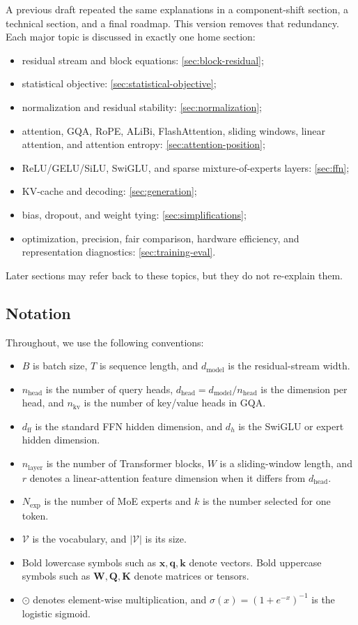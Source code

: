\documentclass[11pt,a4paper]{article}
\theoremstyle{definition}
\theoremstyle{plain}
\newcommand{\vx}{\bm{x}}
\newcommand{\vq}{\bm{q}}
\newcommand{\vk}{\bm{k}}
\newcommand{\mW}{\bm{W}}
\newcommand{\mQ}{\bm{Q}}
\newcommand{\mK}{\bm{K}}
\newcommand{\dmodel}{d_{\mathrm{model}}}
\newcommand{\dhead}{d_{\mathrm{head}}}
\newcommand{\dff}{d_{\mathrm{ff}}}
\newcommand{\nhead}{n_{\mathrm{head}}}
\newcommand{\nlayer}{n_{\mathrm{layer}}}
\newcommand{\vocab}{|\mathcal{V}|}
\begin{document}
\begin{motivationbox}
A previous draft repeated the same explanations in a component-shift section, a technical section, and a final roadmap. This version removes that redundancy. Each major topic is discussed in exactly one home section:
\begin{itemize}[nosep]
    \item residual stream and block equations: \cref{sec:block-residual};
    \item statistical objective: \cref{sec:statistical-objective};
    \item normalization and residual stability: \cref{sec:normalization};
    \item attention, GQA, RoPE, ALiBi, FlashAttention, sliding windows, linear attention, and attention entropy: \cref{sec:attention-position};
    \item ReLU/GELU/SiLU, SwiGLU, and sparse mixture-of-experts layers: \cref{sec:ffn};
    \item KV-cache and decoding: \cref{sec:generation};
    \item bias, dropout, and weight tying: \cref{sec:simplifications};
    \item optimization, precision, fair comparison, hardware efficiency, and representation diagnostics: \cref{sec:training-eval}.
\end{itemize}
Later sections may refer back to these topics, but they do not re-explain them.
\end{motivationbox}

\subsection{Notation}

Throughout, we use the following conventions:
\begin{itemize}[nosep]
    \item $B$ is batch size, $T$ is sequence length, and $\dmodel$ is the residual-stream width.
    \item $\nhead$ is the number of query heads, $\dhead=\dmodel/\nhead$ is the dimension per head, and $n_{\mathrm{kv}}$ is the number of key/value heads in GQA.
    \item $\dff$ is the standard FFN hidden dimension, and $d_h$ is the SwiGLU or expert hidden dimension.
    \item $\nlayer$ is the number of Transformer blocks, $W$ is a sliding-window length, and $r$ denotes a linear-attention feature dimension when it differs from $\dhead$.
    \item $N_{\mathrm{exp}}$ is the number of MoE experts and $k$ is the number selected for one token.
    \item $\mathcal{V}$ is the vocabulary, and $\vocab$ is its size.
    \item Bold lowercase symbols such as $\vx,\vq,\vk$ denote vectors. Bold uppercase symbols such as $\mW,\mQ,\mK$ denote matrices or tensors.
    \item $\odot$ denotes element-wise multiplication, and $\sigma(x)=(1+e^{-x})^{-1}$ is the logistic sigmoid.
\end{itemize}
\end{document}
